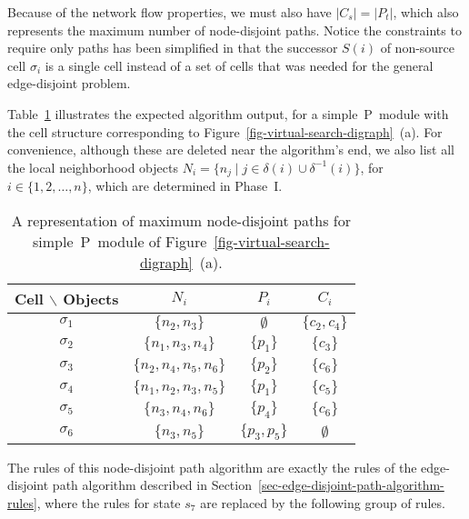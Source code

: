 \documentclass[preliminary,copyright,creativecommons]{eptcs}
\theoremstyle{remark}
\begin{document}
\medskip

\noindent Because of the network flow properties, we must also have $|C_s|=|P_t|$,
which also represents the maximum number of node-disjoint paths.
Notice the constraints to require only paths has been simplified in that the
successor $S(i)$ of non-source cell $\sigma_i$ is a single cell instead of a set of 
cells that was needed for the general edge-disjoint problem.

\bigskip

Table~\ref{tab-node-output-objects} illustrates
the expected algorithm output, for a simple~P~module with the cell structure
corresponding to Figure~\ref{fig-virtual-search-digraph}~(a).
For convenience, although these are deleted near the algorithm's end,
we also list all the local neighborhood objects 
$N_i = \{n_j \mid j\in \delta(i) \cup \delta^{-1}(i)\}$, for $i \in \{1, 2, \ldots, n\}$, 
which are determined in Phase~I.

\setcounter{table}{\thefigure}
\begin{table}[ht]
\caption{A representation of maximum node-disjoint paths for simple~P~module of
Figure~\ref{fig-virtual-search-digraph}~(a).}
\label{tab-node-output-objects}
\begin{center}
\begin{tabular}{ | c | c | c | c | } \hline
Cell $\backslash$ Objects & $N_i$ & $P_i$ & $C_i$ \\ \hline 
$\sigma_1$ & $\{n_2, n_3\}$ & $\emptyset$ & $\{c_2, c_4\}$ \\ \hline
$\sigma_2$ & $\{n_1, n_3, n_4\}$ & $\{p_1\}$ & $\{c_3\}$ \\ \hline
$\sigma_3$ & $\{n_2, n_4, n_5, n_6\}$ & $\{p_2\}$ & $\{c_6\}$ \\ \hline
$\sigma_4$ & $\{n_1, n_2, n_3, n_5\}$ & $\{p_1\}$ & $\{c_5\}$ \\ \hline
$\sigma_5$ & $\{n_3, n_4, n_6\}$ & $\{p_4\}$ & $\{c_6\}$ \\ \hline
$\sigma_6$ & $\{n_3, n_5\}$ & $\{p_3, p_5\}$ & $\emptyset$ \\ \hline
\end{tabular}
\end{center}
\end{table}
\addtocounter{figure}{1}

The rules of this node-disjoint path algorithm are exactly 
the rules of the edge-disjoint path algorithm described in 
Section~\ref{sec-edge-disjoint-path-algorithm-rules},
where the rules for state $s_7$ are replaced by the following group of rules.
\end{document}
